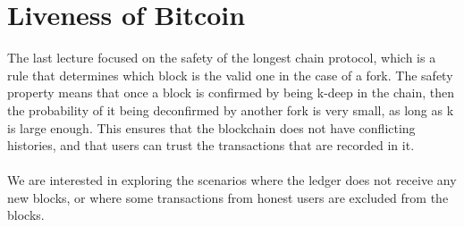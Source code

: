 \chapter{Liveness of Bitcoin}
The last lecture focused on the safety of the longest chain protocol, which is a rule that determines which block is the valid one in the case of a fork. The safety property means that once a block is confirmed by being k-deep in the chain, then the probability of it being deconfirmed by another fork is very small, as long as k is large enough. This ensures that the blockchain does not have conflicting histories, and that users can trust the transactions that are recorded in it.\\\\
We are interested in exploring the scenarios where the ledger does not receive any new blocks, or where some transactions from honest users are excluded from the blocks. 
